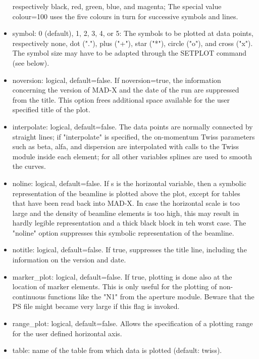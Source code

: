 \begin{itemize}
     respectively black, red, green, blue, and magenta; 
     The special value colour=100  uses the five colours in turn for
     successive symbols and lines.
   \item symbol: 0 (default), 1, 2, 3, 4, or 5: The symbols to be
     plotted at data points, respectively none, dot ("."), plus ("+"),
     star ("*"), circle ("o"), and cross ("x").  
     The symbol size may have to be adapted through the SETPLOT command
     (see below).   
   \item noversion: logical, default=false. If noversion=true, the
     information concerning the version of MAD-X and the date of the run
     are suppressed from the title.  
     This option frees additional space available for the user specified
     title of the plot.  
   \item interpolate: logical, default=false. The data points are
     normally connected by straight lines; if "interpolate" is
     specified, the on-momentum Twiss parameters such as beta, alfa, and
     dispersion are interpolated with calls to the Twiss module inside
     each element; for all other variables splines are used to smooth
     the curves.  
   \item noline: logical, default=false. If s is the horizontal
     variable, then a symbolic representation of the beamline is plotted
     above the plot, except for tables that have been read back into MAD-X. 
     In case the horizontal scale is too large and the density of
     beamline elements is too high, this may result in hardly legible
     representation and a thick black block in teh worst case. 
     The "noline" option suppresses this symbolic representation of the
     beamline. 
   \item notitle: logical, default=false. If true, suppresses the title
     line, including the information on the version and date.  
   \item marker\_plot: logical, default=false. If true, plotting is done
     also at the location of marker elements. This is only useful for
     the plotting of non-continuous functions like the "N1" from the
     aperture module. Beware that the PS file might became very large if
     this flag is invoked.  
   \item range\_plot: logical, default=false. Allows the specification
     of a plotting range for the user defined horizontal axis.   


   \item table: name of the table from which data is plotted (default:
     twiss).  


\end{itemize}
